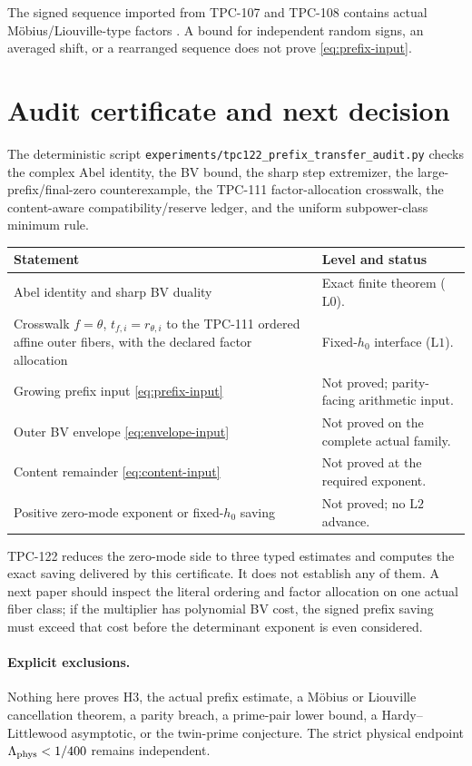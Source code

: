 \documentclass[11pt]{article}
\theoremstyle{definition}
\theoremstyle{remark}
\newcommand{\Lzero}{\mathrm{L0}}
\newcommand{\Lone}{\mathrm{L1}}
\newcommand{\Ltwo}{\mathrm{L2}}
\begin{document}
The signed sequence imported from TPC-107 and TPC-108 contains actual
Möbius/Liouville-type factors \citep{WangTPC107,WangTPC108}.  A bound
for independent random signs, an averaged shift, or a rearranged
sequence does not prove \eqref{eq:prefix-input}.

\section{Audit certificate and next decision}

The deterministic script
\texttt{experiments/tpc122\_prefix\_transfer\_audit.py} checks the
complex Abel identity, the BV bound, the sharp step extremizer, the
large-prefix/final-zero counterexample, the TPC-111 factor-allocation
crosswalk, the content-aware compatibility/reserve ledger, and the
uniform subpower-class minimum rule.

\begin{center}
\small
\begin{tabularx}{\textwidth}{@{}p{}X@{}}
\toprule
Statement & Level and status\\
\midrule
Abel identity and sharp BV duality
& Exact finite theorem (\(\Lzero\)).\\
Crosswalk \(f=\theta\), \(t_{f,i}=r_{\theta,i}\) to the TPC-111
ordered affine outer fibers, with the declared factor allocation
& Fixed-\(h_0\) interface (\(\Lone\)).\\
Growing prefix input \eqref{eq:prefix-input}
& Not proved; parity-facing arithmetic input.\\
Outer BV envelope \eqref{eq:envelope-input}
& Not proved on the complete actual family.\\
Content remainder \eqref{eq:content-input}
& Not proved at the required exponent.\\
Positive zero-mode exponent or fixed-\(h_0\) saving
& Not proved; no \(\Ltwo\) advance.\\
\bottomrule
\end{tabularx}
\end{center}

TPC-122 reduces the zero-mode side to three typed estimates and
computes the exact saving delivered by this certificate.  It does not establish
any of them.  A next paper should inspect the literal ordering and
factor allocation on one actual fiber class; if the multiplier has
polynomial BV cost, the signed prefix saving must exceed that cost
before the determinant exponent is even considered.

\paragraph{Explicit exclusions.}
Nothing here proves H3, the actual prefix estimate, a Möbius or
Liouville cancellation theorem, a parity breach, a prime-pair lower
bound, a Hardy--Littlewood asymptotic, or the twin-prime conjecture.
The strict physical endpoint
\(\Lambda_{\rm phys}<1/400\) remains independent.

\begingroup
\small
\setlength{\bibsep}{2pt plus 0.3ex}
\sloppy


\endgroup
\end{document}
